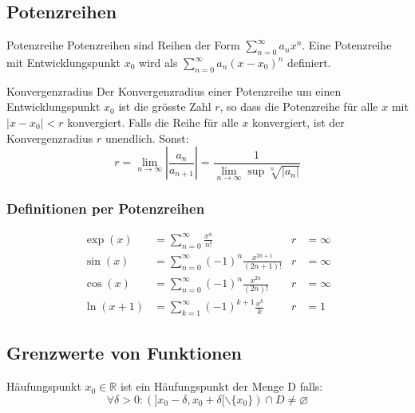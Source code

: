 \documentclass[a4paper,8pt]{extarticle}
\def\limn{\lim_{n\to \infty}}
\def\sumk{\sum_{k=1}^\infty}
\def\sumn{\sum_{n=0}^\infty}
\def\R{\mathbb{R}}
\begin{document}
\subsection{Potenzreihen}
\begin{subbox}{Potenzreihe}
 Potenzreihen sind Reihen der Form $\sum_{n=0}^\infty a_n x^n$. Eine Potenzreihe mit Entwicklungspunkt $x_0$ wird als $\sum_{n=0}^\infty a_n(x-x_0)^n$ definiert.
\end{subbox}

\begin{mainbox}{Konvergenzradius}
 Der Konvergenzradius einer Potenzreihe um einen Entwicklungspunkt $x_0$ ist die grösste Zahl $r$, so dass die Potenzreihe für alle $x$ mit $|x - x_0| < r$ konvergiert. Falls die Reihe für alle $x$ konvergiert, ist der Konvergenzradius $r$ unendlich. Sonst:
 $$r = \limn \left| \frac{a_n}{a_{n+1}} \right| = \frac{1}{\limn\sup \sqrt[n]{|a_n|}} $$
\end{mainbox}

\subsubsection{Definitionen per Potenzreihen}
\begin{align*}
\exp(x) &= \sumn \frac{x^n}{n!} & r &= \infty \\
\sin(x) &= \sumn (-1)^n \frac{x^{2n + 1}}{(2n + 1)!} & r &= \infty \\
\cos(x) &= \sumn (-1)^n \frac{x^{2n}}{(2n)!} & r &= \infty \\
\ln(x + 1) &= \sumk (-1)^{k+1} \frac{x^k}{k} & r &= 1
\end{align*}

\subsection{Grenzwerte von Funktionen}
\begin{subbox}{Häufungspunkt}
 $x_0 \in \R$ ist ein Häufungspunkt der Menge D falls: $$\forall \delta > 0: (]x_0 - \delta, x_0 + \delta[ \backslash \{x_0\}) \cap D \ne \varnothing$$
\end{subbox}
\end{document}
